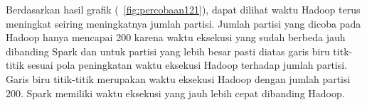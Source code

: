 Berdasarkan hasil grafik (~\ref{fig:percobaan121}), dapat dilihat waktu Hadoop terus meningkat seiring meningkatnya jumlah partisi. Jumlah partisi yang dicoba pada Hadoop hanya mencapai 200 karena waktu eksekusi yang sudah berbeda jauh dibanding Spark dan untuk partisi yang lebih besar pasti diatas garis biru titk-titik sesuai pola peningkatan waktu eksekusi Hadoop terhadap jumlah partisi. Garis biru titik-titik merupakan waktu eksekusi Hadoop dengan jumlah partisi 200. Spark memiliki waktu eksekusi yang jauh lebih cepat dibanding Hadoop. 




